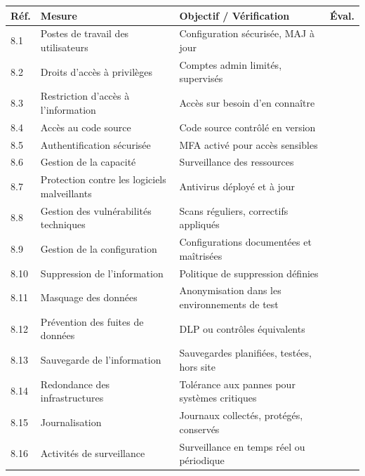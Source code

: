 \documentclass[12pt,a4paper,oneside]{report}
\begin{document}
\begin{longtable}{|p{1.5cm}|p{6.5cm}|p{4.5cm}|p{1cm}|}
\hline
\rowcolor{theadcolor}
\color{white}\textbf{Réf.} &
\color{white}\textbf{Mesure} &
\color{white}\textbf{Objectif / Vérification} &
\color{white}\textbf{Éval.} \\
\hline\endhead\hline\endfoot
\rowcolor{trow1}
8.1 & Postes de travail des utilisateurs &
  Configuration sécurisée, MAJ à jour & \\
\hline\rowcolor{trow2}
8.2 & Droits d'accès à privilèges &
  Comptes admin limités, supervisés & \\
\hline\rowcolor{trow1}
8.3 & Restriction d'accès à l'information &
  Accès sur besoin d'en connaître & \\
\hline\rowcolor{trow2}
8.4 & Accès au code source &
  Code source contrôlé en version & \\
\hline\rowcolor{trow1}
8.5 & Authentification sécurisée &
  MFA activé pour accès sensibles & \\
\hline\rowcolor{trow2}
8.6 & Gestion de la capacité &
  Surveillance des ressources & \\
\hline\rowcolor{trow1}
8.7 & Protection contre les logiciels malveillants &
  Antivirus déployé et à jour & \\
\hline\rowcolor{trow2}
8.8 & Gestion des vulnérabilités techniques &
  Scans réguliers, correctifs appliqués & \\
\hline\rowcolor{trow1}
8.9 & Gestion de la configuration &
  Configurations documentées et maîtrisées & \\
\hline\rowcolor{trow2}
8.10 & Suppression de l'information &
  Politique de suppression définies & \\
\hline\rowcolor{trow1}
8.11 & Masquage des données &
  Anonymisation dans les environnements de test & \\
\hline\rowcolor{trow2}
8.12 & Prévention des fuites de données &
  DLP ou contrôles équivalents & \\
\hline\rowcolor{trow1}
8.13 & Sauvegarde de l'information &
  Sauvegardes planifiées, testées, hors site & \\
\hline\rowcolor{trow2}
8.14 & Redondance des infrastructures &
  Tolérance aux pannes pour systèmes critiques & \\
\hline\rowcolor{trow1}
8.15 & Journalisation &
  Journaux collectés, protégés, conservés & \\
\hline\rowcolor{trow2}
8.16 & Activités de surveillance &
  Surveillance en temps réel ou périodique & \\

\end{longtable}
\end{document}
